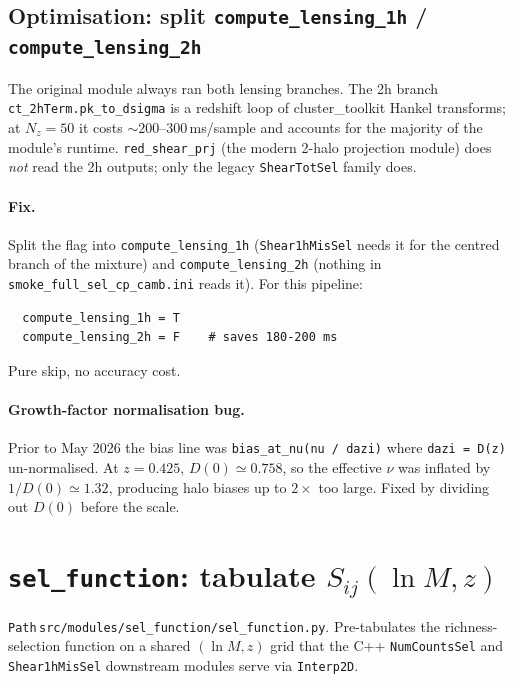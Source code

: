 \documentclass[a4paper, 11pt]{article}
\newcommand{\modname}[1]{\textcolor{kwcol}{\texttt{#1}}}
\newcommand{\pyfile}[1]{{\small\texttt{#1}}}
\begin{document}
\subsection{Optimisation: split \texttt{compute\_lensing\_1h} / \texttt{compute\_lensing\_2h}}

The original module always ran both lensing branches.  The 2h branch
\texttt{ct\_2hTerm.pk\_to\_dsigma} is a redshift loop of
cluster\_toolkit Hankel transforms; at $N_z = 50$ it costs
$\sim 200$--$300\,$ms/sample and accounts for the majority of the
module's runtime.  \modname{red\_shear\_prj} (the modern 2-halo projection
module) does \emph{not} read the 2h outputs; only the legacy
\modname{ShearTotSel} family does.

\paragraph{Fix.}  Split the flag into \texttt{compute\_lensing\_1h}
(\modname{Shear1hMisSel} needs it for the centred branch of the
mixture) and \texttt{compute\_lensing\_2h}
(nothing in \modname{smoke\_full\_sel\_cp\_camb.ini} reads it).  For this
pipeline:
\begin{verbatim}
  compute_lensing_1h = T
  compute_lensing_2h = F    # saves 180-200 ms
\end{verbatim}
Pure skip, no accuracy cost.

\paragraph{Growth-factor normalisation bug.}  Prior to May 2026 the
bias line was \texttt{bias\_at\_nu(nu / dazi)} where \texttt{dazi =
D(z)} un-normalised.  At $z{=}0.425$, $D(0) \simeq 0.758$, so the
effective $\nu$ was inflated by $1/D(0) \simeq 1.32$, producing halo
biases up to $2\times$ too large.  Fixed by dividing out
$D(0)$ before the scale.

\section{\texttt{sel\_function}: tabulate $S_{ij}(\ln M, z)$}
\label{sec:sel_function}

\modname{Path}\,\pyfile{src/modules/sel\_function/sel\_function.py}.
Pre-tabulates the richness-selection function on a shared
$(\ln M, z)$ grid that the C++ \modname{NumCountsSel} and
\modname{Shear1hMisSel} downstream modules serve via \texttt{Interp2D}.
\end{document}
